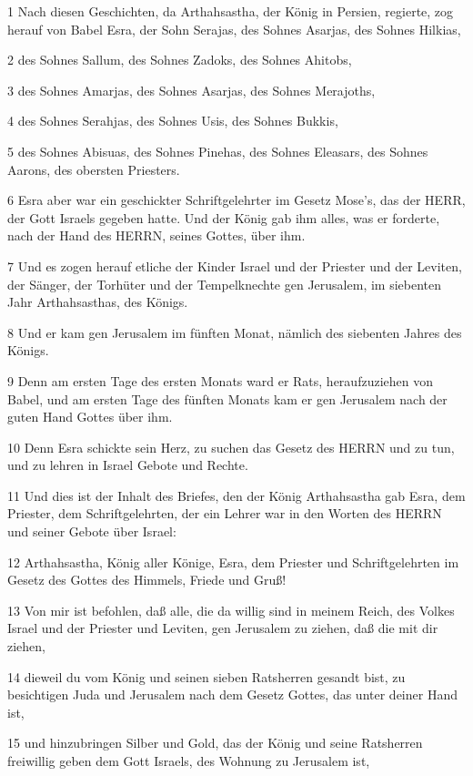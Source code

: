 \par 1 Nach diesen Geschichten, da Arthahsastha, der König in Persien, regierte, zog herauf von Babel Esra, der Sohn Serajas, des Sohnes Asarjas, des Sohnes Hilkias,
\par 2 des Sohnes Sallum, des Sohnes Zadoks, des Sohnes Ahitobs,
\par 3 des Sohnes Amarjas, des Sohnes Asarjas, des Sohnes Merajoths,
\par 4 des Sohnes Serahjas, des Sohnes Usis, des Sohnes Bukkis,
\par 5 des Sohnes Abisuas, des Sohnes Pinehas, des Sohnes Eleasars, des Sohnes Aarons, des obersten Priesters.
\par 6 Esra aber war ein geschickter Schriftgelehrter im Gesetz Mose's, das der HERR, der Gott Israels gegeben hatte. Und der König gab ihm alles, was er forderte, nach der Hand des HERRN, seines Gottes, über ihm.
\par 7 Und es zogen herauf etliche der Kinder Israel und der Priester und der Leviten, der Sänger, der Torhüter und der Tempelknechte gen Jerusalem, im siebenten Jahr Arthahsasthas, des Königs.
\par 8 Und er kam gen Jerusalem im fünften Monat, nämlich des siebenten Jahres des Königs.
\par 9 Denn am ersten Tage des ersten Monats ward er Rats, heraufzuziehen von Babel, und am ersten Tage des fünften Monats kam er gen Jerusalem nach der guten Hand Gottes über ihm.
\par 10 Denn Esra schickte sein Herz, zu suchen das Gesetz des HERRN und zu tun, und zu lehren in Israel Gebote und Rechte.
\par 11 Und dies ist der Inhalt des Briefes, den der König Arthahsastha gab Esra, dem Priester, dem Schriftgelehrten, der ein Lehrer war in den Worten des HERRN und seiner Gebote über Israel:
\par 12 Arthahsastha, König aller Könige, Esra, dem Priester und Schriftgelehrten im Gesetz des Gottes des Himmels, Friede und Gruß!
\par 13 Von mir ist befohlen, daß alle, die da willig sind in meinem Reich, des Volkes Israel und der Priester und Leviten, gen Jerusalem zu ziehen, daß die mit dir ziehen,
\par 14 dieweil du vom König und seinen sieben Ratsherren gesandt bist, zu besichtigen Juda und Jerusalem nach dem Gesetz Gottes, das unter deiner Hand ist,
\par 15 und hinzubringen Silber und Gold, das der König und seine Ratsherren freiwillig geben dem Gott Israels, des Wohnung zu Jerusalem ist,
